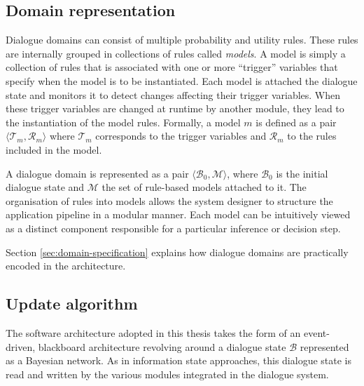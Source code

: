 

\subsection{Domain representation}

Dialogue domains can consist of multiple probability and utility rules. These rules are internally grouped in collections of rules called \textit{models}. A model is simply a collection of rules that is associated with one or more ``trigger'' variables that specify when the model is to be instantiated. Each model is attached the dialogue state and monitors it to detect changes affecting their trigger variables. When these trigger variables are changed at runtime by another module, they lead to the instantiation of the model rules. Formally, a model $m$ is defined as a pair $\langle \mathcal{T}_m, \mathcal{R}_m \rangle$ where $\mathcal{T}_m$ corresponds to the trigger variables and $\mathcal{R}_m$ to the rules included in the model.

A dialogue domain is represented as a pair $\langle \mathcal{B}_0, \mathcal{M} \rangle$, where $\mathcal{B}_0$ is the initial dialogue state  and $\mathcal{M}$ the set of rule-based models attached to it. The organisation of rules into models allows the system designer to structure the application pipeline in a modular manner. Each model can be intuitively viewed as a distinct component responsible for a particular inference or decision step. 

Section \ref{sec:domain-specification} explains how dialogue domains are practically encoded in the \opendial architecture. 

\subsection{Update algorithm} 

The software architecture adopted in this thesis takes the form of an event-driven, blackboard architecture \citep{jaspis2004,Buckley:2006} revolving around a dialogue state $\mathcal{B}$ represented as a Bayesian network.  As in information state approaches, this dialogue state is read and written by the various modules integrated in the dialogue system. 

